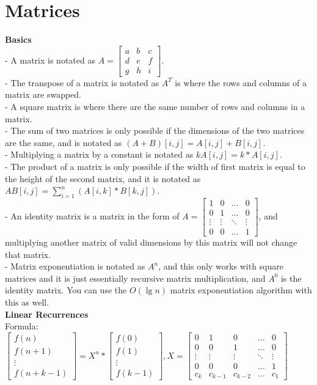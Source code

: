 \documentclass[12pt]{report}
\begin{document}
\section{Matrices}
\textbf{Basics}\\
- A matrix is notated as \(A=\begin{bmatrix}a&b&c\\d&e&f\\g&h&i\end{bmatrix}\).\\
- The transpose of a matrix is notated as \(A^T\) is where the rows and columns of a matrix are swapped.\\
- A square matrix is where there are the same number of rows and columns in a matrix.\\
- The sum of two matrices is only possible if the dimensions of the two matrices are the same, and is notated as \((A+B)[i,j]=A[i,j]+B[i,j]\).\\
- Multiplying a matrix by a constant is notated as \(kA[i,j]=k*A[i,j]\).\\
- The product of a matrix is only possible if the width of first matrix is equal to the height of the second matrix, and it is notated as \(AB[i,j]=\sum_{i=1}^{n}(A[i,k]*B[k,j])\).\\
- An identity matrix is a matrix in the form of \(A=\begin{bmatrix}1&0&\dots&0\\0&1&\dots&0\\\vdots&\vdots&\ddots&\vdots\\0&0&\dots&1\end{bmatrix}\), and multiplying another matrix of valid dimensions by this matrix will not change that matrix.\\
- Matrix exponentiation is notated as \(A^n\), and this only works with square matrices and it is just essentially recursive matrix multiplication, and \(A^0\) is the identity matrix. You can use the \(O(\lg{n})\) matrix exponentiation algorithm with this as well.\\
\textbf{Linear Recurrences}\\
Formula: \(\begin{bmatrix}f(n)\\f(n+1)\\\vdots\\f(n+k-1)\end{bmatrix}=X^n*\begin{bmatrix}f(0)\\f(1)\\\vdots\\f(k-1)\end{bmatrix},X=\begin{bmatrix}0&1&0&\dots&0\\0&0&1&\dots&0\\\vdots&\vdots&\vdots&\ddots&\vdots\\0&0&0&\dots&1\\c_k&c_{k-1}&c_{k-2}&\dots&c_1\end{bmatrix}\)\\
\end{document}

